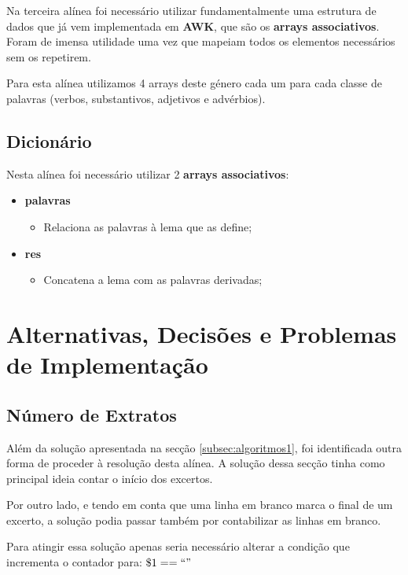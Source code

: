 \documentclass[11pt,a4paper]{report}
\begin{document}
Na terceira alínea foi necessário utilizar fundamentalmente uma estrutura de dados que já vem implementada em \textbf{AWK}, que são os \textbf{arrays associativos}. Foram de imensa utilidade uma vez que mapeiam todos os elementos necessários sem os repetirem.

Para esta alínea utilizamos 4 arrays deste género cada um para cada classe de palavras (verbos, substantivos, adjetivos e advérbios).

\subsection{Dicionário}

Nesta alínea foi necessário utilizar 2 \textbf{arrays associativos}:

\begin{itemize}
	\item \textbf{palavras}
		\begin{itemize}
			\item Relaciona as palavras à lema que as define;
		\end{itemize}
	\item \textbf{res}
		\begin{itemize}
			\item Concatena a lema com as palavras derivadas;
		\end{itemize}
\end{itemize}

\section{Alternativas, Decisões e Problemas de Implementação}

\subsection{Número de Extratos}

Além da solução apresentada na secção \ref{subsec:algoritmos1}, foi identificada outra forma de proceder à resolução desta alínea. A solução dessa secção tinha como principal ideia contar o início dos excertos.

Por outro lado, e tendo em conta que uma linha em branco marca o final de um excerto, a solução podia passar também por contabilizar as linhas em branco.

Para atingir essa solução apenas seria necessário alterar a condição que incrementa o contador para: \underline{$\$1==``"$}
\end{document}
